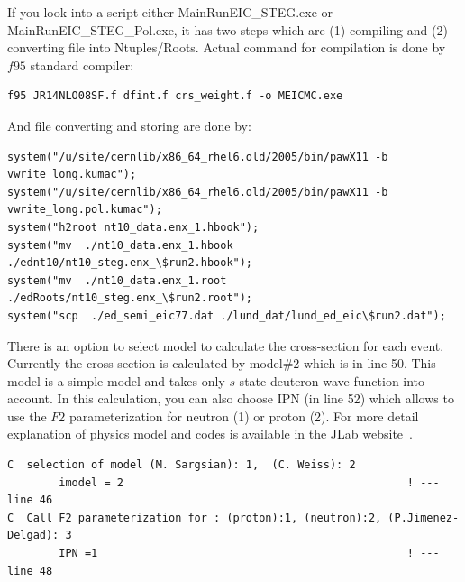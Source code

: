 \documentclass[12pt,letterpaper]{article}
\begin{document}
If you look into a script either MainRunEIC\_STEG.exe or MainRunEIC\_STEG\_Pol.exe, it has two steps which are (1) compiling and (2) converting file into Ntuples/Roots. Actual command for compilation is done by $f95$ standard compiler:
\fontsize{9}{9}
\begin{Verbatim}[frame=single]
       f95 JR14NLO08SF.f dfint.f crs_weight.f -o MEICMC.exe
\end{Verbatim}
\fontsize{12}{12}
And file converting and storing are done by:
\fontsize{9}{9}
\begin{Verbatim}[frame=single]
system("/u/site/cernlib/x86_64_rhel6.old/2005/bin/pawX11 -b vwrite_long.kumac");
system("/u/site/cernlib/x86_64_rhel6.old/2005/bin/pawX11 -b vwrite_long.pol.kumac");
system("h2root nt10_data.enx_1.hbook");
system("mv  ./nt10_data.enx_1.hbook  ./ednt10/nt10_steg.enx_\$run2.hbook");
system("mv  ./nt10_data.enx_1.root  ./edRoots/nt10_steg.enx_\$run2.root");
system("scp  ./ed_semi_eic77.dat ./lund_dat/lund_ed_eic\$run2.dat");
\end{Verbatim}
\fontsize{12}{12}


 

There is an option to select model to calculate the cross-section for each event. Currently the cross-section is calculated by model\#2 which is in line 50. This model is a simple model and takes only $s$-state deuteron wave function into account. In this calculation, you can also choose IPN (in line 52) which allows to use the $F2$ parameterization for neutron (1) or proton (2). For more detail explanation of physics model and codes is available in the JLab website~\cite{JLabtheoryWeb}.\\

\fontsize{9}{9}
\begin{Verbatim}[frame=single]
C  selection of model (M. Sargsian): 1,  (C. Weiss): 2
        imodel = 2                                            ! --- line 46
C  Call F2 parameterization for : (proton):1, (neutron):2, (P.Jimenez-Delgad): 3
        IPN =1                                                ! --- line 48
\end{Verbatim}
\fontsize{12}{12}
\end{document}
